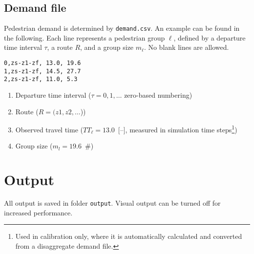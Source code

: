 \documentclass[a4paper,12pt]{article}
\begin{document}
\subsection{Demand file} \label{demand_file}
Pedestrian demand is determined by \verb+demand.csv+. An example can be found in the following. Each line represents a pedestrian group $\ell$, defined by a departure time interval $\tau$, a route $R$, and a group size $m_\ell$. No blank lines are allowed.

\begin{Verbatim}
0,zs-z1-zf, 13.0, 19.6
1,zs-z1-zf, 14.5, 27.7
2,zs-z1-zf, 11.0, 5.3
\end{Verbatim}

\begin{enumerate}
\item Departure time interval ($\tau = 0,1,\dots$ zero-based numbering)
\item Route ($R = (z1, z2, \dots$))
\item Observed travel time ($TT_\ell = 13.0$~[--], measured in simulation time steps\footnote{Used in calibration only, where it is automatically calculated and converted from a disaggregate demand file.})
\item Group size ($m_l = 19.6$~\#)
\end{enumerate}

\section{Output}
All output is saved in folder \verb+output+. Visual output can be turned off for increased performance.
\end{document}
